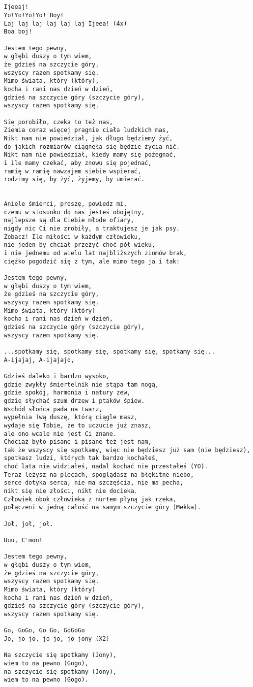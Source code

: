 \documentclass[12pt]{article}
\begin{document}
\subsection*{}
\begin{verbatim}
Ijeeaj!
Yo!Yo!Yo!Yo! Boy!
Laj laj laj laj laj laj Ijeea! (4x)
Boa boj!

Jestem tego pewny,
w głębi duszy o tym wiem,
że gdzieś na szczycie góry,
wszyscy razem spotkamy się.
Mimo świata, który (który),
kocha i rani nas dzień w dzień,
gdzieś na szczycie góry (szczycie góry),
wszyscy razem spotkamy się.

Się porobiło, czeka to też nas,
Ziemia coraz więcej pragnie ciała ludzkich mas,
Nikt nam nie powiedział, jak długo będziemy żyć,
do jakich rozmiarów ciągnęła się będzie życia nić.
Nikt nam nie powiedział, kiedy mamy się pożegnać,
i ile mamy czekać, aby znowu się pojednać,
ramię w ramię nawzajem siebie wspierać,
rodzimy się, by żyć, żyjemy, by umierać.


Aniele śmierci, proszę, powiedz mi,
czemu w stosunku do nas jesteś obojętny,
najlepsze są dla Ciebie młode ofiary,
nigdy nic Ci nie zrobiły, a traktujesz je jak psy.
Zobacz! Ile miłości w każdym człowieku,
nie jeden by chciał przeżyć choć pół wieku,
i nie jednemu od wielu lat najbliższych ziomów brak,
ciężko pogodzić się z tym, ale mimo tego ja i tak:

Jestem tego pewny,
w głębi duszy o tym wiem,
że gdzieś na szczycie góry,
wszyscy razem spotkamy się.
Mimo świata, który (który)
kocha i rani nas dzień w dzień,
gdzieś na szczycie góry (szczycie góry),
wszyscy razem spotkamy się.

...spotkamy się, spotkamy się, spotkamy się, spotkamy się...
A-ijajaj, A-ijajajo,

Gdzieś daleko i bardzo wysoko,
gdzie zwykły śmiertelnik nie stąpa tam nogą,
gdzie spokój, harmonia i natury zew,
gdzie słychać szum drzew i ptaków śpiew.
Wschód słońca pada na twarz,
wypełnia Twą duszę, którą ciągle masz,
wydaje się Tobie, że to uczucie już znasz,
ale ono wcale nie jest Ci znane.
Chociaż było pisane i pisane też jest nam,
tak że wszyscy się spotkamy, więc nie będziesz już sam (nie będziesz),
spotkasz ludzi, których tak bardzo kochałeś,
choć lata nie widziałeś, nadal kochać nie przestałeś (YO).
Teraz leżysz na plecach, spoglądasz na błękitne niebo,
serce dotyka serca, nie ma szczęścia, nie ma pecha,
nikt się nie złości, nikt nie docieka.
Człowiek obok człowieka z nurtem płyną jak rzeka,
połączeni w jedną całość na samym szczycie góry (Mekka).

Joł, joł, joł.

Uuu, C'mon!

Jestem tego pewny,
w głębi duszy o tym wiem,
że gdzieś na szczycie góry,
wszyscy razem spotkamy się.
Mimo świata, który (który)
kocha i rani nas dzień w dzień,
gdzieś na szczycie góry (szczycie góry),
wszyscy razem spotkamy się.

Go, GoGo, Go Go, GoGoGo
Jo, jo jo, jo jo, jo jony (X2)

Na szczycie się spotkamy (Jony),
wiem to na pewno (Gogo),
na szczycie się spotkamy (Jony),
wiem to na pewno (Gogo).
\end{verbatim}
\clearpage
\end{document}
